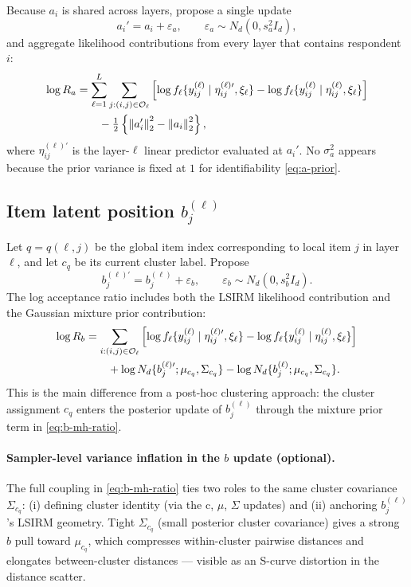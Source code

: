 \documentclass[11pt]{article}
\newcommand{\norm}[1]{\left\lVert #1 \right\rVert}
\begin{document}
Because $a_i$ is shared across layers, propose a single update
\[
    a_i'=a_i+\varepsilon_a,\qquad \varepsilon_a\sim N_d(0,s_a^2 I_d),
\]
and aggregate likelihood contributions from every layer that contains
respondent $i$:
\begin{align}
    \log R_a
    &=
    \sum_{\ell=1}^L
    \sum_{j:(i,j)\in\mathcal O_\ell}
    \left[
    \log f_\ell\{y_{ij}^{(\ell)}\mid \eta_{ij}^{(\ell)\prime},\xi_\ell\}
    -
    \log f_\ell\{y_{ij}^{(\ell)}\mid \eta_{ij}^{(\ell)},\xi_\ell\}
    \right]
    \notag\\
    &\qquad
    -\tfrac{1}{2}\left\{\norm{a_i'}_2^2-\norm{a_i}_2^2\right\},
    \label{eq:a-mh-ratio}
\end{align}
where $\eta_{ij}^{(\ell)\prime}$ is the layer-$\ell$ linear predictor
evaluated at $a_i'$.  No $\sigma_a^2$ appears because the prior variance is
fixed at $1$ for identifiability \eqref{eq:a-prior}.

\subsection{Item latent position $b_j^{(\ell)}$}

Let $q=q(\ell,j)$ be the global item index corresponding to local item $j$ in
layer $\ell$, and let $c_q$ be its current cluster label.  Propose
\[
    b_j^{(\ell)\prime}
    =
    b_j^{(\ell)}+\varepsilon_b,
    \qquad
    \varepsilon_b\sim N_d(0,s_b^2 I_d).
\]
The log acceptance ratio includes both the LSIRM likelihood contribution and
the Gaussian mixture prior contribution:
\begin{align}
    \log R_b
    &=
    \sum_{i:(i,j)\in\mathcal O_\ell}
    \left[
    \log f_\ell\{y_{ij}^{(\ell)}\mid \eta_{ij}^{(\ell)\prime},\xi_\ell\}
    -
    \log f_\ell\{y_{ij}^{(\ell)}\mid \eta_{ij}^{(\ell)},\xi_\ell\}
    \right]
    \notag\\
    &\qquad
    +
    \log N_d\{b_j^{(\ell)\prime};\mu_{c_q},\Sigma_{c_q}\}
    -
    \log N_d\{b_j^{(\ell)};\mu_{c_q},\Sigma_{c_q}\}.
    \label{eq:b-mh-ratio}
\end{align}
This is the main difference from a post-hoc clustering approach: the cluster
assignment $c_q$ enters the posterior update of $b_j^{(\ell)}$ through the
mixture prior term in \eqref{eq:b-mh-ratio}.

\paragraph{Sampler-level variance inflation in the $b$ update (optional).}
The full coupling in \eqref{eq:b-mh-ratio} ties two roles to the same cluster
covariance $\Sigma_{c_q}$: (i) defining cluster identity (via the c, $\mu$,
$\Sigma$ updates) and (ii) anchoring $b_j^{(\ell)}$'s LSIRM geometry.
Tight $\Sigma_{c_q}$ (small posterior cluster covariance) gives a strong $b$
pull toward $\mu_{c_q}$, which compresses within-cluster pairwise distances
and elongates between-cluster distances --- visible as an S-curve distortion
in the distance scatter.
\end{document}
